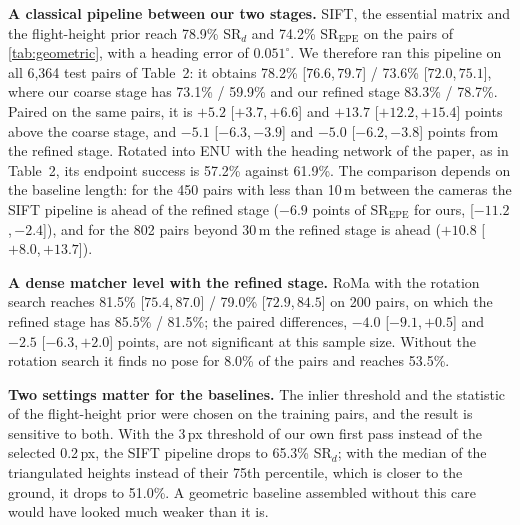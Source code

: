 \documentclass[10pt,twocolumn,letterpaper]{article}
\newcommand{\SRd}{SR$_{d}$}
\newcommand{\SRe}{SR$_{\mathrm{EPE}}$}
\newcommand{\ci}[2]{{\scriptsize[\ensuremath{#1},\,\ensuremath{#2}]}}
\begin{document}
\noindent\textbf{A classical pipeline between our two stages.} SIFT, the essential matrix and the flight-height prior reach 78.9\% \SRd{} and 74.2\% \SRe{} on the pairs of \cref{tab:geometric}, with a heading error of $0.051^\circ$. We therefore ran this pipeline on all 6{,}364 test pairs of Table~2: it obtains 78.2\% \ci{76.6}{79.7} / 73.6\% \ci{72.0}{75.1}, where our coarse stage has 73.1\% / 59.9\% and our refined stage 83.3\% / 78.7\%. Paired on the same pairs, it is \ensuremath{+5.2}{} \ci{\ensuremath{+3.7}}{\ensuremath{+6.6}} and \ensuremath{+13.7}{} \ci{\ensuremath{+12.2}}{\ensuremath{+15.4}} points above the coarse stage, and \ensuremath{-5.1}{} \ci{\ensuremath{-6.3}}{\ensuremath{-3.9}} and \ensuremath{-5.0}{} \ci{\ensuremath{-6.2}}{\ensuremath{-3.8}} points from the refined stage. Rotated into ENU with the heading network of the paper, as in Table~2, its endpoint success is 57.2\% against 61.9\%. The comparison depends on the baseline length: for the 450 pairs with less than 10\,m between the cameras the SIFT pipeline is ahead of the refined stage (\ensuremath{-6.9}{} points of \SRe{} for ours, \ci{\ensuremath{-11.2}}{\ensuremath{-2.4}}), and for the 802 pairs beyond 30\,m the refined stage is ahead (\ensuremath{+10.8}{} \ci{\ensuremath{+8.0}}{\ensuremath{+13.7}}).

\noindent\textbf{A dense matcher level with the refined stage.} RoMa with the rotation search reaches 81.5\% \ci{75.4}{87.0} / 79.0\% \ci{72.9}{84.5} on 200 pairs, on which the refined stage has 85.5\% / 81.5\%; the paired differences, \ensuremath{-4.0}{} \ci{\ensuremath{-9.1}}{\ensuremath{+0.5}} and \ensuremath{-2.5}{} \ci{\ensuremath{-6.3}}{\ensuremath{+2.0}} points, are not significant at this sample size. Without the rotation search it finds no pose for 8.0\% of the pairs and reaches 53.5\%.

\noindent\textbf{Two settings matter for the baselines.} The inlier threshold and the statistic of the flight-height prior were chosen on the training pairs, and the result is sensitive to both. With the 3\,px threshold of our own first pass instead of the selected 0.2\,px, the SIFT pipeline drops to 65.3\% \SRd; with the median of the triangulated heights instead of their 75th percentile, which is closer to the ground, it drops to 51.0\%. A geometric baseline assembled without this care would have looked much weaker than it is.
\end{document}
